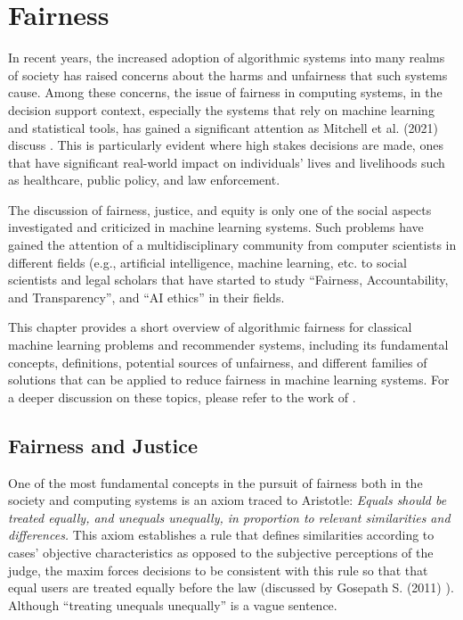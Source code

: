 \chapter{Fairness}
\label{ch:fairness}

In recent years, the increased adoption of algorithmic systems into many realms of society has raised concerns about the harms and unfairness that such systems cause. Among these concerns, the issue of fairness in computing systems, in the decision support context, especially the systems that rely on machine learning and statistical tools, has gained a significant attention as Mitchell et al. (2021) discuss \cite{mitchell2021algorithmic}. This is particularly evident where high stakes decisions are made, ones that have significant real-world impact on individuals’ lives and livelihoods such as healthcare, public policy, and law enforcement.

The discussion of fairness, justice, and equity is only one of the social aspects investigated and criticized in machine learning systems. Such problems have gained the attention of a multidisciplinary community from computer scientists in different fields (e.g., artificial intelligence, machine learning, etc. to social scientists and legal scholars that have started to study ``Fairness, Accountability, and Transparency'', and ``AI ethics'' in their fields.

This chapter provides a short overview of algorithmic fairness for classical machine learning problems and recommender systems, including its fundamental concepts, definitions, potential sources of unfairness, and different families of solutions that can be applied to reduce fairness in machine learning systems. For a deeper discussion on these topics, please refer to the work of \cite{mitchell2021algorithmic,barocas2016big,barocas2018fairness}.

\section{Fairness and Justice}
\label{sec:fair_&_justice}
    
    One of the most fundamental concepts in the pursuit of fairness both in the society and computing systems is an axiom traced to Aristotle: \textit{Equals should be treated equally, and unequals unequally, in proportion to relevant similarities and differences.} This axiom establishes a rule that defines similarities according to cases’ objective characteristics as opposed to the subjective perceptions of the judge, the maxim forces decisions to be consistent with this rule so that that equal users are treated equally before the law (discussed by Gosepath S. (2011) \cite{Gosepath2011equality}). Although ``treating unequals unequally'' is a vague sentence. 
    
